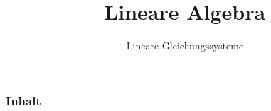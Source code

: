 

\title{Lineare Algebra}
\subtitle{Lineare Gleichungssysteme}



\makeTitlePage

\begin{frame}\frametitle{Inhalt}
   \tableofcontents
\end{frame}
%

%

